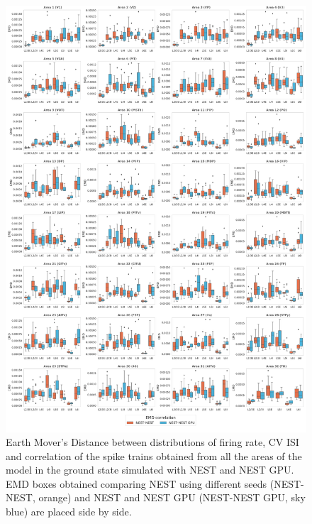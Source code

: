\documentclass[a4paper, 12pt, twoside, openright]{book}
\begin{document}
\begin{figure}[H]
    \centering
    \includegraphics[width=\columnwidth]{figures/emd_boxplot_vert_gs_correlation.pdf}
    \caption{Earth Mover’s Distance between distributions of firing rate, CV ISI and correlation of the spike trains obtained from all the areas of the model in the ground state simulated with NEST and NEST GPU. EMD boxes obtained comparing NEST using different seeds (NEST-NEST, orange) and NEST and NEST GPU (NEST-NEST GPU, sky blue) are placed side by side.}
    \label{fig:emd_gs}
\end{figure}
\end{document}
